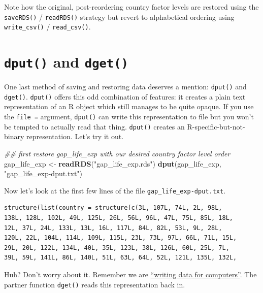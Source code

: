 \documentclass[
]{book}
\newenvironment{Shaded}{\begin{snugshade}}{\end{snugshade}}
\newcommand{\CommentTok}[1]{\textcolor[rgb]{0.56,0.35,0.01}{\textit{#1}}}
\newcommand{\KeywordTok}[1]{\textcolor[rgb]{0.13,0.29,0.53}{\textbf{#1}}}
\newcommand{\NormalTok}[1]{#1}
\newcommand{\StringTok}[1]{\textcolor[rgb]{0.31,0.60,0.02}{#1}}
\begin{document}
Note how the original, post-reordering country factor levels are restored using the \texttt{saveRDS()} / \texttt{readRDS()} strategy but revert to alphabetical ordering using \texttt{write\_csv()} / \texttt{read\_csv()}.

\hypertarget{dput-and-dget}{%
\section{\texorpdfstring{\texttt{dput()} and \texttt{dget()}}{dput() and dget()}}\label{dput-and-dget}}

One last method of saving and restoring data deserves a mention: \texttt{dput()} and \texttt{dget()}. \texttt{dput()} offers this odd combination of features: it creates a plain text representation of an R object which still manages to be quite opaque. If you use the \texttt{file\ =} argument, \texttt{dput()} can write this representation to file but you won't be tempted to actually read that thing. \texttt{dput()} creates an R-specific-but-not-binary representation. Let's try it out.

\begin{Shaded}
\begin{Highlighting}[]
\CommentTok{## first restore gap_life_exp with our desired country factor level order}
\NormalTok{gap_life_exp <-}\StringTok{ }\KeywordTok{readRDS}\NormalTok{(}\StringTok{"gap_life_exp.rds"}\NormalTok{)}
\KeywordTok{dput}\NormalTok{(gap_life_exp, }\StringTok{"gap_life_exp-dput.txt"}\NormalTok{)}
\end{Highlighting}
\end{Shaded}

Now let's look at the first few lines of the file \texttt{gap\_life\_exp-dput.txt}.

\begin{verbatim}
structure(list(country = structure(c(3L, 107L, 74L, 2L, 98L, 
138L, 128L, 102L, 49L, 125L, 26L, 56L, 96L, 47L, 75L, 85L, 18L, 
12L, 37L, 24L, 133L, 13L, 16L, 117L, 84L, 82L, 53L, 9L, 28L, 
120L, 22L, 104L, 114L, 109L, 115L, 23L, 73L, 97L, 66L, 71L, 15L, 
29L, 20L, 122L, 134L, 40L, 35L, 123L, 38L, 126L, 60L, 25L, 7L, 
39L, 59L, 141L, 86L, 140L, 51L, 63L, 64L, 52L, 121L, 135L, 132L, 
\end{verbatim}

Huh? Don't worry about it. Remember we are \href{https://twitter.com/vsbuffalo/statuses/358699162679787521}{``writing data for computers''}. The partner function \texttt{dget()} reads this representation back in.
\end{document}
